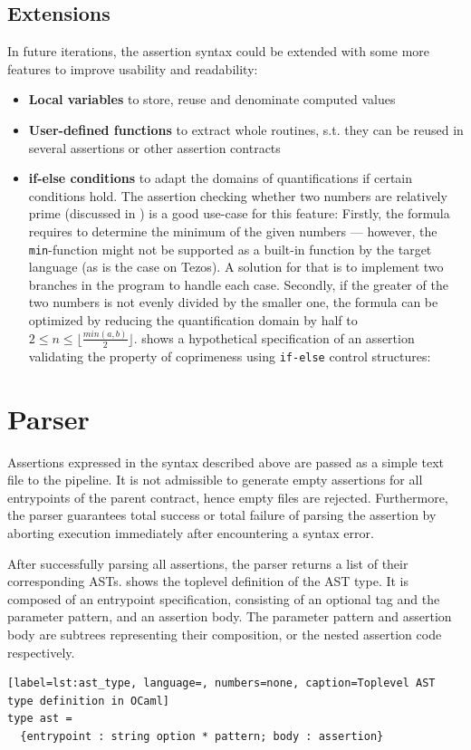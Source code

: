 \subsection{Extensions}\label{sec:ext}
In future iterations, the assertion syntax could be extended with some more features to improve usability and readability:
\begin{itemize}
\item \textbf{Local variables} to store, reuse and denominate computed values
\item \textbf{User-defined functions} to extract whole routines, s.t. they can be reused in several assertions or other assertion contracts
\item \textbf{if-else conditions} to adapt the domains of quantifications if certain conditions hold. The assertion checking whether two numbers are relatively prime (discussed in ) is a good use-case for this feature: Firstly, the formula requires to determine the minimum of the given numbers --- however, the \texttt{min}-function might not be supported as a built-in function by the target language (as is the case on Tezos). A solution for that is to implement two branches in the program to handle each case. Secondly, if the greater of the two numbers is not evenly divided by the smaller one, the formula can be optimized by reducing the quantification domain by half to $2 \le n \le \lfloor \frac{min(a,b)}{2} \rfloor$.  shows a hypothetical specification of an assertion validating the property of coprimeness using \texttt{if-else} control structures:

\end{itemize}

\section{Parser}
Assertions expressed in the syntax described above are passed as a simple text file to the pipeline. It is not admissible to generate empty assertions for all entrypoints of the parent contract, hence empty files are rejected. Furthermore, the parser guarantees total success or total failure of parsing the assertion by aborting execution immediately after encountering a syntax error. 

After successfully parsing all assertions, the parser returns a list of their corresponding ASTs.  shows the toplevel definition of the AST type. It is composed of an entrypoint specification, consisting of an optional tag and the parameter pattern, and an assertion body. The parameter pattern and assertion body are subtrees representing their composition, or the nested assertion code respectively.
\begin{lstlisting}[label=lst:ast_type, language=, numbers=none, caption=Toplevel AST type definition in OCaml]
type ast =
  {entrypoint : string option * pattern; body : assertion}
\end{lstlisting}

